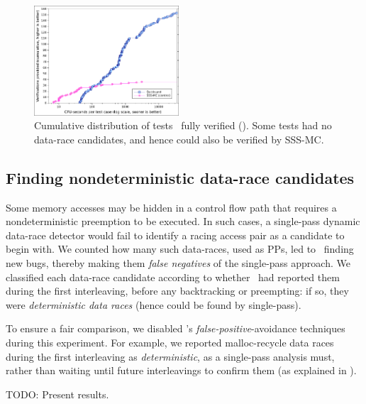 \begin{figure}[t]
	\includegraphics[width=0.48\textwidth]{totalverifs.pdf}
	\caption{Cumulative distribution of tests \quicksand~fully verified (\sect{\ref{sec:totalverif}}).
	Some tests had no data-race candidates, and hence could also be verified by SSS-MC.}
	\label{fig:totalverif}
\end{figure}



\subsection{Finding nondeterministic data-race candidates}
\label{sec:eval-falseneg}
Some memory accesses may be hidden in a control flow path that requires a nondeterministic preemption to be executed.
In such cases, a single-pass dynamic data-race detector
would fail
to identify a racing access pair as a candidate to begin with.
%
We counted how many such data-races, used as PPs, led to \quicksand~finding new bugs,
thereby making them {\em false negatives} of the single-pass approach.
We classified each data-race candidate according to whether \landslide~had reported them during the first interleaving, before any backtracking or preempting: if so, they were {\em deterministic data races} (hence could be found by single-pass).

To ensure a fair comparison, we disabled \landslide's {\em false-positive}-avoidance techniques during this experiment.
For example, we reported malloc-recycle data races during the first interleaving as {\em deterministic}, as a single-pass analysis must,
rather than waiting until future interleavings to confirm them (as explained in \sect{\ref{sec:recycle}}).

TODO: Present results.

